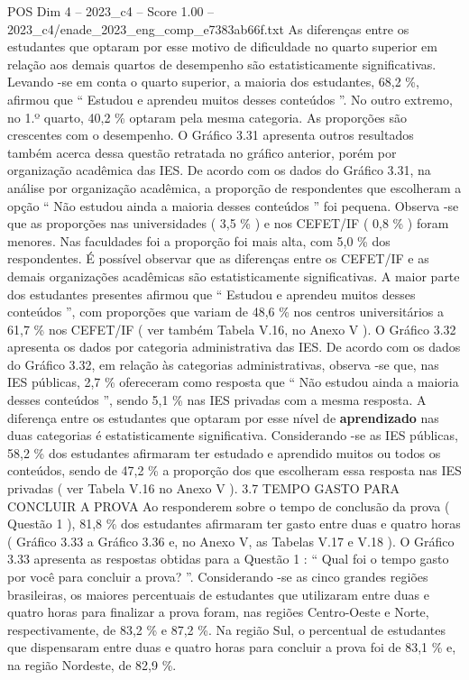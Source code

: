 \begin{textsample}{POS Dim 4 – 2023\_c4 – Score 1.00 – 2023\_c4/enade\_2023\_eng\_comp\_e7383ab66f.txt}
As diferenças entre os estudantes que optaram por esse motivo de dificuldade no quarto superior em relação aos demais quartos de desempenho são estatisticamente significativas.
Levando -se em conta o quarto superior, a maioria dos estudantes, 68,2 \%, afirmou que “ Estudou e aprendeu muitos desses conteúdos ”.
No outro extremo, no 1.º quarto, 40,2 \% optaram pela mesma categoria.
As proporções são crescentes com o desempenho.
O Gráfico 3.31 apresenta outros resultados também acerca dessa questão retratada no gráfico anterior, porém por organização acadêmica das IES.
De acordo com os dados do Gráfico 3.31, na análise por organização acadêmica, a proporção de respondentes que escolheram a opção “ Não estudou ainda a maioria desses conteúdos ” foi pequena.
Observa -se que as proporções nas universidades ( 3,5 \% ) e nos CEFET/IF ( 0,8 \% ) foram menores.
Nas faculdades foi a proporção foi mais alta, com 5,0 \% dos respondentes.
É possível observar que as diferenças entre os CEFET/IF e as demais organizações acadêmicas são estatisticamente significativas.
A maior parte dos estudantes presentes afirmou que “ Estudou e aprendeu muitos desses conteúdos ”, com proporções que variam de 48,6 \% nos centros universitários a 61,7 \% nos CEFET/IF ( ver também Tabela V.16, no Anexo V ).
O Gráfico 3.32 apresenta os dados por categoria administrativa das IES.
De acordo com os dados do Gráfico 3.32, em relação às categorias administrativas, observa -se que, nas IES públicas, 2,7 \% ofereceram como resposta que “ Não estudou ainda a maioria desses conteúdos ”, sendo 5,1 \% nas IES privadas com a mesma resposta.
A diferença entre os estudantes que optaram por esse nível de \textbf{aprendizado} nas duas categorias é estatisticamente significativa.
Considerando -se as IES públicas, 58,2 \% dos estudantes afirmaram ter estudado e aprendido muitos ou todos os conteúdos, sendo de 47,2 \% a proporção dos que escolheram essa resposta nas IES privadas ( ver Tabela V.16 no Anexo V ). 3.7 TEMPO GASTO PARA CONCLUIR A PROVA Ao responderem sobre o tempo de conclusão da prova ( Questão 1 ), 81,8 \% dos estudantes afirmaram ter gasto entre duas e quatro horas ( Gráfico 3.33 a Gráfico 3.36 e, no Anexo V, as Tabelas V.17 e V.18 ).
O Gráfico 3.33 apresenta as respostas obtidas para a Questão 1 : “ Qual foi o tempo gasto por você para concluir a prova? ”.
Considerando -se as cinco grandes regiões brasileiras, os maiores percentuais de estudantes que utilizaram entre duas e quatro horas para finalizar a prova foram, nas regiões Centro-Oeste e Norte, respectivamente, de 83,2 \% e 87,2 \%.
Na região Sul, o percentual de estudantes que dispensaram entre duas e quatro horas para concluir a prova foi de 83,1 \% e, na região Nordeste, de 82,9 \%.

\end{textsample}

